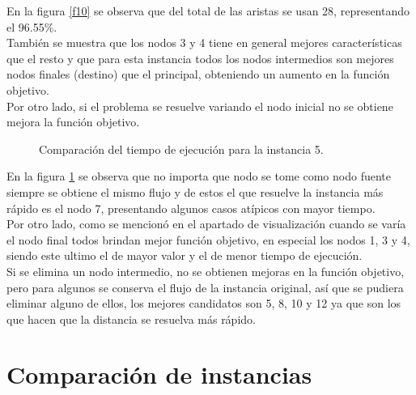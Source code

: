 \documentclass[12pt]{article}
\begin{document}
En la figura \ref{f10} se observa que del total de las aristas se usan 28, representando el 96.55\%. \\

También se muestra que los nodos 3 y 4 tiene en general mejores características que el resto y que para esta instancia todos los nodos intermedios son mejores nodos finales (destino) que el principal, obteniendo un aumento en la función objetivo. \\

Por otro lado, si el problema se resuelve variando el nodo inicial no se obtiene mejora la función objetivo.

\newpage

\begin{figure}[H]
\centering
{}

\caption{Comparación del tiempo de ejecución para la instancia 5.} \label{f11}
\end{figure}

En la figura \ref{f11} se observa que no importa que nodo se tome como nodo fuente siempre se obtiene el mismo flujo y de estos el que resuelve la instancia más rápido es el nodo 7, presentando algunos casos atípicos con mayor tiempo. \\

Por otro lado, como se mencionó en el apartado de visualización cuando se varía el nodo final todos brindan mejor función objetivo, en especial los nodos 1, 3 y 4, siendo este ultimo el de mayor valor y el de menor tiempo de ejecución.\\

Si se elimina un nodo intermedio, no se obtienen mejoras en la función objetivo, pero para algunos se conserva el flujo de la instancia original, así que se pudiera eliminar alguno de ellos, los mejores candidatos son 5, 8, 10 y 12 ya que son los que hacen que la distancia se resuelva más rápido. 

\newpage
\section*{Comparación de instancias}
\end{document}
